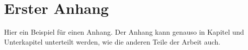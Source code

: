 \chapter{Erster Anhang}

Hier ein Beispiel für einen Anhang. Der Anhang kann genauso in Kapitel und Unterkapitel unterteilt werden, wie die anderen Teile der Arbeit auch.
